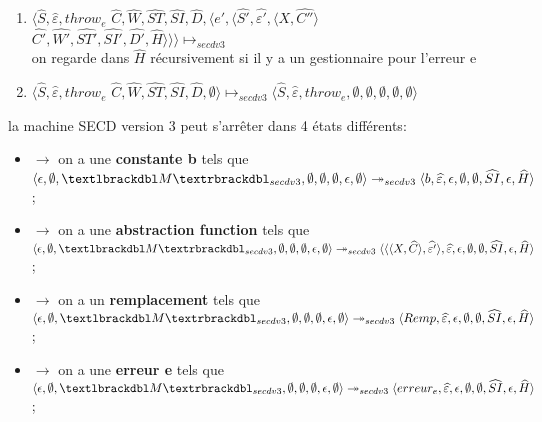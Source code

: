 \documentclass[10pt,a4paper]{article}
\begin{document}
\begin{enumerate}
					\item $\langle\widehat{S},\widehat{\varepsilon},throw_{e}$ $\widehat{C},\widehat{W},\widehat{ST},\widehat{SI},\widehat{D},\langle e',\langle\widehat{S'},\widehat{\varepsilon'},\langle X,\widehat{C''}\rangle$ $\widehat{C'},\widehat{W'},\widehat{ST'},\widehat{SI'},\widehat{D'},\widehat{H}\rangle\rangle\rangle \longmapsto_{secdv3}$\\on regarde dans $\widehat{H}$ récursivement si il y a un gestionnaire pour l'erreur e
					\item $\langle\widehat{S},\widehat{\varepsilon},throw_{e}$ $\widehat{C},\widehat{W},\widehat{ST},\widehat{SI},\widehat{D},\emptyset\rangle \longmapsto_{secdv3} \langle\widehat{S},\widehat{\varepsilon},throw_{e},\emptyset,\emptyset,\emptyset,\emptyset,\emptyset\rangle$  
				\end{enumerate}
				\bigbreak
				
				
				la machine SECD version 3 peut s'arrêter dans 4 états différents:
				\begin{itemize}
					\item[]$\longrightarrow$ on a une \textbf{constante b} tels que $\langle \epsilon,\emptyset,\textlbrackdbl M\textrbrackdbl_{secdv3},\emptyset,\emptyset,\emptyset,\epsilon,\emptyset\rangle \twoheadrightarrow_{secdv3} \langle b,\widehat{\varepsilon},\epsilon,\emptyset,\emptyset,\widehat{SI},\epsilon,\widehat{H}\rangle$;
					\item[]$\longrightarrow$ on a une \textbf{abstraction function} tels que $\langle \epsilon,\emptyset,\textlbrackdbl M\textrbrackdbl_{secdv3},\emptyset,\emptyset,\emptyset,\epsilon,\emptyset\rangle \twoheadrightarrow_{secdv3} \langle\langle\langle X,\widehat{C}\rangle,\widehat{\varepsilon'}\rangle,\widehat{\varepsilon},\epsilon,\emptyset,\emptyset,\widehat{SI},\epsilon,\widehat{H}\rangle$;
					\item[]$\longrightarrow$ on a un \textbf{remplacement} tels que $\langle \epsilon,\emptyset,\textlbrackdbl M\textrbrackdbl_{secdv3},\emptyset,\emptyset,\emptyset,\epsilon,\emptyset\rangle \twoheadrightarrow_{secdv3} \langle Remp,\widehat{\varepsilon},\epsilon,\emptyset,\emptyset,\widehat{SI},\epsilon,\widehat{H}\rangle$;
					\item[]$\longrightarrow$ on a une \textbf{erreur e} tels que $\langle \epsilon,\emptyset,\textlbrackdbl M\textrbrackdbl_{secdv3},\emptyset,\emptyset,\emptyset,\epsilon,\emptyset\rangle \twoheadrightarrow_{secdv3} \langle erreur_{e},\widehat{\varepsilon},\epsilon,\emptyset,\emptyset,\widehat{SI},\epsilon,\widehat{H}\rangle$;
				\end{itemize}
		\newpage
\end{document}
